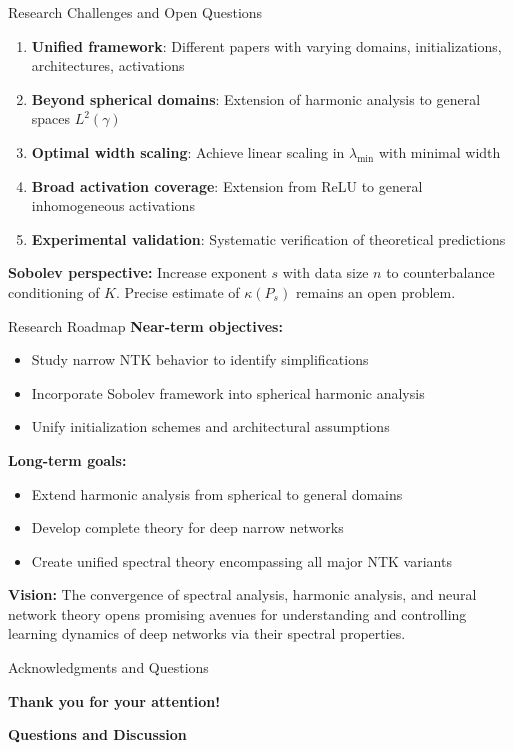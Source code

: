 \documentclass{beamer}
\begin{document}
\begin{frame}{Research Challenges and Open Questions}
\begin{enumerate}
\item \textbf{Unified framework}: Different papers with varying domains, initializations, architectures, activations

\item \textbf{Beyond spherical domains}: Extension of harmonic analysis to general spaces $L^2(\gamma)$

\item \textbf{Optimal width scaling}: Achieve linear scaling in $\lambda_{\min}$ with minimal width

\item \textbf{Broad activation coverage}: Extension from ReLU to general inhomogeneous activations

\item \textbf{Experimental validation}: Systematic verification of theoretical predictions
\end{enumerate}

\textbf{Sobolev perspective:} Increase exponent $s$ with data size $n$ to counterbalance conditioning of $K$. Precise estimate of $\kappa(P_s)$ remains an open problem.
\end{frame}

\begin{frame}{Research Roadmap}
\textbf{Near-term objectives:}
\begin{itemize}
\item Study narrow NTK behavior to identify simplifications
\item Incorporate Sobolev framework into spherical harmonic analysis
\item Unify initialization schemes and architectural assumptions
\end{itemize}

\textbf{Long-term goals:}
\begin{itemize}
\item Extend harmonic analysis from spherical to general domains
\item Develop complete theory for deep narrow networks
\item Create unified spectral theory encompassing all major NTK variants
\end{itemize}

\textbf{Vision:} The convergence of spectral analysis, harmonic analysis, and neural network theory opens promising avenues for understanding and controlling learning dynamics of deep networks via their spectral properties.
\end{frame}

\begin{frame}{Acknowledgments and Questions}
\begin{center}
\textbf{Thank you for your attention!}

\vspace{1cm}

\textbf{Questions and Discussion}

\vspace{1cm}

\end{center}
\end{frame}
\end{document}
